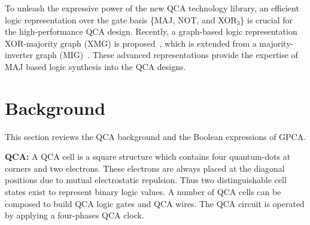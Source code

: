 \documentclass[9pt,journal,compsoc]{IEEEtran}
\begin{document}
To unleash the expressive power of the new QCA technology library, an efficient logic representation over the gate basis \{MAJ, NOT, and XOR$_3$\} is crucial for the high-performance QCA design. Recently, a graph-based logic representation XOR-majority graph (XMG) is proposed~\cite{haaswijk2017novel}, which is extended from a majority-inverter graph (MIG)~\cite{amaru2014majority}. 
These advanced representations provide the expertise of MAJ based logic synthesis into the QCA designs.

% 



\vspace{-2ex}
\section{Background}
This section reviews the QCA background and the Boolean expressions of GPCA.

\textbf{QCA:}
A QCA cell is a square structure which contains four quantum-dots at corners and two electrons.
These electrons are always placed at the diagonal positions due to mutual electrostatic repulsion. Thus two distinguishable cell states exist to represent binary logic values. A number of QCA cells can be composed to build QCA logic gates and QCA wires.
The QCA circuit is operated by applying a four-phases QCA clock.
\end{document}

